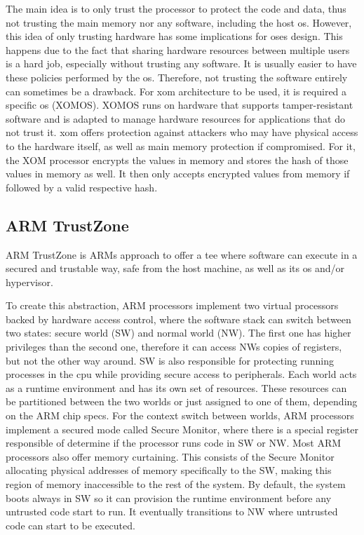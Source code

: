 The main idea is to only trust the processor to protect the code and data, thus not trusting the main memory nor any software, including the host \gls{os}.
However, this idea of only trusting hardware has some implications for \gls{os}es design. This happens due to the fact that sharing hardware resources between multiple users is a hard job, especially without trusting any software. It is usually easier to have these policies performed by the \gls{os}. Therefore, not trusting the software entirely can sometimes be a drawback.  
For \gls{xom} architecture to be used, it is required a specific \gls{os} (XOMOS). XOMOS runs on hardware that supports tamper-resistant software and is adapted to manage hardware resources for applications that do not trust it.
\gls{xom} offers protection against attackers who may have physical access to the hardware itself, as well as main memory protection if compromised. For it, the XOM processor encrypts the values in memory and stores the hash of those values in memory as well. It then only accepts encrypted values from memory if followed by a valid respective hash. 



\subsection{ARM TrustZone}
\label{ssec:armtz}

ARM TrustZone \cite{armTZPaper} is ARMs approach to offer a \gls{tee} where software can execute in a secured and trustable way, safe from the host machine, as well as its \gls{os} and/or hypervisor. 

To create this abstraction, ARM processors implement two virtual processors backed by hardware access control, where the software stack can switch between two states: secure world (SW) and normal world (NW). 
The first one has higher privileges than the second one, therefore it can access NWs copies of registers, but not the other way around. SW is also responsible for protecting running processes in the \gls{cpu} while providing secure access to peripherals. 
Each world acts as a runtime environment and has its own set of resources. These resources can be partitioned between the two worlds or just assigned to one of them, depending on the ARM chip specs.
For the context switch between worlds, ARM processors implement a secured mode called Secure Monitor, where there is a special register responsible of determine if the processor runs code in SW or NW. 
Most ARM processors also offer memory curtaining. This consists of the Secure Monitor allocating physical addresses of memory specifically to the SW, making this region of memory inaccessible to the rest of the system.
By default, the system boots always in SW so it can provision the runtime environment before any untrusted code start to run. It eventually transitions to NW where untrusted code can start to be executed. 

